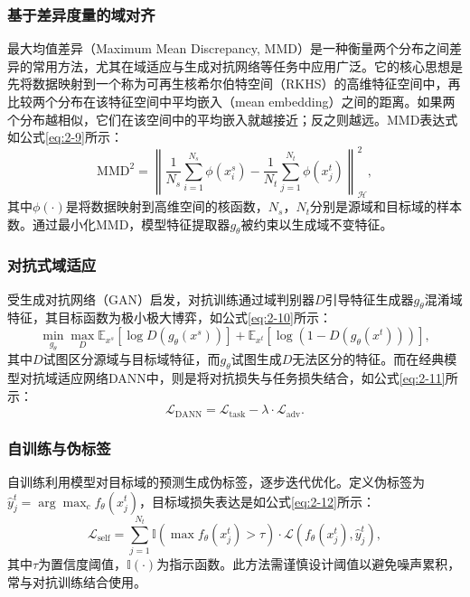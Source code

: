 \subsubsection{基于差异度量的域对齐}
最大均值差异（Maximum Mean Discrepancy, MMD）是一种衡量两个分布之间差异的常用方法，尤其在域适应与生成对抗网络等任务中应用广泛。它的核心思想是先将数据映射到一个称为可再生核希尔伯特空间（RKHS）的高维特征空间中，再比较两个分布在该特征空间中平均嵌入（mean embedding）之间的距离。如果两个分布越相似，它们在该空间中的平均嵌入就越接近；反之则越远。MMD表达式如公式\eqref{eq:2-9}所示：
\begin{equation}
    \label{eq:2-9}
    \text{MMD}^2 = \left\| \frac{1}{N_s} \sum_{i=1}^{N_s} \phi(x_i^s) - \frac{1}{N_t} \sum_{j=1}^{N_t} \phi(x_j^t) \right\|_{\mathcal{H}}^2,
\end{equation}
其中$\phi(\cdot)$是将数据映射到高维空间的核函数，$N_s$，$N_t$分别是源域和目标域的样本数。通过最小化MMD，模型特征提取器$g_\theta$被约束以生成域不变特征。%
\subsubsection{对抗式域适应}
受生成对抗网络（GAN）启发，对抗训练通过域判别器$D$引导特征生成器$g_\theta$混淆域特征，其目标函数为极小极大博弈，如公式\eqref{eq:2-10}所示：
\begin{equation}
    \label{eq:2-10}
    \min_{g_\theta} \max_{D} \mathbb{E}_{x^s}[\log D(g_\theta(x^s))] + \mathbb{E}_{x^t}[\log (1 - D(g_\theta(x^t)))],
\end{equation}
其中$D$试图区分源域与目标域特征，而$g_\theta$试图生成$D$无法区分的特征。而在经典模型对抗域适应网络DANN中，则是将对抗损失与任务损失结合，如公式\eqref{eq:2-11}所示：
\begin{equation}
    \label{eq:2-11}
    \mathcal{L}_{\text{DANN}} = \mathcal{L}_{\text{task}} - \lambda \cdot \mathcal{L}_{\text{adv}}.
\end{equation}

\subsubsection{自训练与伪标签}
自训练利用模型对目标域的预测生成伪标签，逐步迭代优化。定义伪标签为$\hat{y}_j^t = \arg\max_c f_\theta(x_j^t)$，目标域损失表达是如公式\eqref{eq:2-12}所示：
\begin{equation}
    \label{eq:2-12}
    \mathcal{L}_{\text{self}} = \sum_{j=1}^{N_t} \mathbb{I}(\max f_\theta(x_j^t) > \tau) \cdot \mathcal{L}(f_\theta(x_j^t), \hat{y}_j^t),
\end{equation}
其中$\tau$为置信度阈值，$\mathbb{I}(\cdot)$为指示函数。此方法需谨慎设计阈值以避免噪声累积，常与对抗训练结合使用。

